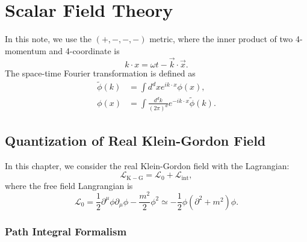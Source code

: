 \chapter{Scalar Field Theory}
In this note, we use the $(+,-,-,-)$ metric, where the inner product of two 4-momentum and 4-coordinate is
\begin{equation}
	k\cdot x=\omega t-\vec k\cdot \vec x.
\end{equation}
The space-time Fourier transformation is defined as
\begin{equation}
\begin{aligned}
	\tilde{\phi}(k) &= \int d^{d}x e^{ik\cdot x} \phi(x), \\ 
	\phi(x) &= \int \frac{d^{d}k}{(2\pi)^{d}} e^{-ik\cdot x}\tilde{\phi}(k).
\end{aligned}
\end{equation}






\section{Quantization of Real Klein-Gordon Field}

In this chapter, we consider the real Klein-Gordon field with the Lagrangian:
\begin{equation}
	\mathcal{L}_{\mathrm{K-G}} = \mathcal{L}_0 + \mathcal{L}_{\mathrm{int}},
\end{equation}
where the free field Langrangian is 
\begin{equation}
	\mathcal L_0 = \frac{1}{2}\partial^\mu \phi \partial_\mu \phi -\frac{m^2}{2}\phi^2 
	\simeq -\frac{1}{2}\phi (\partial^2+m^2) \phi.
\end{equation}


\subsection{Path Integral Formalism}


